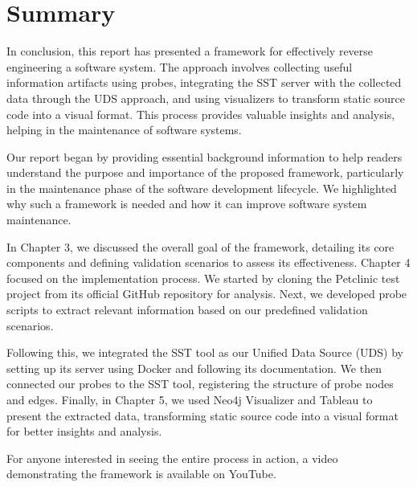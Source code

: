 \section{Summary}

In conclusion, this report has presented a framework for effectively reverse engineering a software system. The approach involves collecting useful information artifacts using probes, integrating the SST server with the collected data through the UDS approach, and using visualizers to transform static source code into a visual format. This process provides valuable insights and analysis, helping in the maintenance of software systems.

Our report began by providing essential background information to help readers understand the purpose and importance of the proposed framework, particularly in the maintenance phase of the software development lifecycle. We highlighted why such a framework is needed and how it can improve software system maintenance.

In Chapter 3, we discussed the overall goal of the framework, detailing its core components and defining validation scenarios to assess its effectiveness. Chapter 4 focused on the implementation process. We started by cloning the Petclinic test project from its official GitHub repository for analysis. Next, we developed probe scripts to extract relevant information based on our predefined validation scenarios. 

Following this, we integrated the SST tool as our Unified Data Source (UDS) by setting up its server using Docker and following its documentation. We then connected our probes to the SST tool, registering the structure of probe nodes and edges. Finally, in Chapter 5, we used Neo4j Visualizer and Tableau to present the extracted data, transforming static source code into a visual format for better insights and analysis.

For anyone interested in seeing the entire process in action, a video demonstrating the framework is available on YouTube.